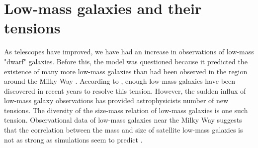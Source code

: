\section{Low-mass galaxies and their tensions}

As telescopes have improved, we have had an increase in observations of low-mass "dwarf" galaxies. Before this, the \lcdm\* model was questioned because it predicted the existence of many more low-mass galaxies than had been observed in the region around the Milky Way \citep{klypinWhereAreMissing1999}. According to \cite{salesBaryonicSolutionsChallenges2022}, enough low-mass galaxies have been discovered in recent years to resolve this tension. However, the sudden influx of low-mass galaxy observations has provided astrophysicists number of new tensions. The diversity of the size-mass relation of low-mass galaxies is one such tension. Observational data of low-mass galaxies near the Milky Way suggests that the correlation between the mass and size of satellite low-mass galaxies is not as strong as simulations seem to predict \citep{salesBaryonicSolutionsChallenges2022}. 

